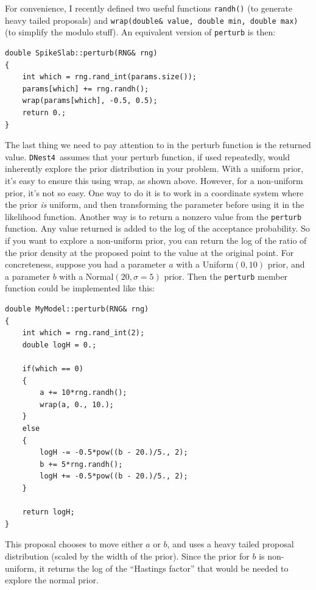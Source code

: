 \documentclass[a4paper, 11pt]{article}
\newcommand{\dnest}{{\tt DNest4}}
\begin{document}
For convenience, I recently defined two useful functions {\tt randh()}
(to generate heavy tailed proposals) and
{\tt wrap(double\& value, double min, double max)} (to simplify the modulo
stuff). An equivalent version of {\tt perturb} is then:\\

\begin{framed}
\begin{verbatim}
double SpikeSlab::perturb(RNG& rng)
{
	int which = rng.rand_int(params.size());
	params[which] += rng.randh();
	wrap(params[which], -0.5, 0.5);
	return 0.;
}
\end{verbatim}
\end{framed}

The last thing we need to pay attention to in the perturb function is the
returned value. \dnest~assumes that your perturb function, if used repeatedly,
would inherently explore the prior distribution in your problem. With
a uniform prior, it's easy to ensure this using wrap, as shown above.
However, for a non-uniform prior,
it's not so easy. One way to do it is to work in a coordinate system where
the prior {\it is} uniform, and then transforming the parameter before using
it in the likelihood function. Another way is to return a nonzero value from
the {\tt perturb} function. Any value returned is added to the log of the
acceptance probability. So if you want to explore a non-uniform prior, you
can return the log of the ratio of the prior density at the proposed point
to the value at the original point. For concreteness, suppose you had a
parameter $a$ with a Uniform$(0,10)$ prior, and a parameter $b$ with a
Normal$(20, \sigma=5)$ prior. Then the {\tt perturb} member function could be implemented
like this:\newpage

\begin{framed}
\begin{verbatim}
double MyModel::perturb(RNG& rng)
{
    int which = rng.rand_int(2);
    double logH = 0.;

    if(which == 0)
    {
        a += 10*rng.randh();
        wrap(a, 0., 10.);
    }
    else
    {
        logH -= -0.5*pow((b - 20.)/5., 2);
        b += 5*rng.randh();
        logH += -0.5*pow((b - 20.)/5., 2);
    }

    return logH;
}
\end{verbatim}
\end{framed}

This proposal chooses to move either $a$ or $b$, and uses a heavy tailed
proposal distribution (scaled by the width of the prior). Since the prior for
$b$ is non-uniform, it returns the log of the ``Hastings factor'' that would
be needed to explore the normal prior.\\
\end{document}

